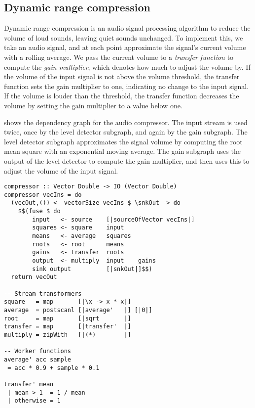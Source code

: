 \subsection{Dynamic range compression}
Dynamic range compression is an audio signal processing algorithm to reduce the volume of loud sounds, leaving quiet sounds unchanged.
To implement this, we take an audio signal, and at each point approximate the signal's current volume with a rolling average.
We pass the current volume to a \emph{transfer function} to compute the \emph{gain multiplier}, which denotes how much to adjust the volume by.
If the volume of the input signal is not above the volume threshold, the transfer function sets the gain multiplier to one, indicating no change to the input signal.
If the volume is louder than the threshold, the transfer function decreases the volume by setting the gain multiplier to a value below one.

 shows the dependency graph for the audio compressor.
The input stream is used twice, once by the level detector subgraph, and again by the gain subgraph.
The level detector subgraph approximates the signal volume by computing the root mean square with an exponential moving average.
The gain subgraph uses the output of the level detector to compute the gain multiplier, and then uses this to adjust the volume of the input signal.

\begin{lstlisting}[float,label=l:bench:compressorFolderol,caption=Folderol implementation of \Hs/compressor/]
compressor :: Vector Double -> IO (Vector Double)
compressor vecIns = do
  (vecOut,()) <- vectorSize vecIns $ \snkOut -> do
    $$(fuse $ do
        input   <- source    [|sourceOfVector vecIns|]
        squares <- square    input
        means   <- average   squares
        roots   <- root      means
        gains   <- transfer  roots
        output  <- multiply  input    gains
        sink output          [|snkOut|]$$)
  return vecOut

-- Stream transformers
square   = map       [|\x -> x * x|]
average  = postscanl [|average'   |] [|0|]
root     = map       [|sqrt       |]
transfer = map       [|transfer'  |]
multiply = zipWith   [|(*)        |]

-- Worker functions
average' acc sample
 = acc * 0.9 + sample * 0.1

transfer' mean
 | mean > 1  = 1 / mean
 | otherwise = 1
\end{lstlisting}

